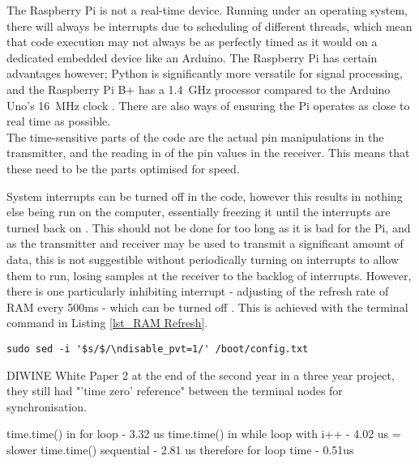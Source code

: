 \documentclass[../main.tex]{subfiles}
\begin{document}

The Raspberry Pi is not a real-time device.
Running under an operating system, there will always be interrupts due to scheduling of different threads, which mean that code execution may not always be as perfectly timed as it would on a dedicated embedded device like an Arduino.
The Raspberry Pi has certain advantages however; Python is significantly more versatile for signal processing, and the Raspberry Pi B+ has a \SI{1.4}{\giga\hertz} processor compared to the Arduino Uno's \SI{16}{\mega\hertz} clock \cite{lib_Arduino}.
There are also ways of ensuring the Pi operates as close to real time as possible.\\

The time-sensitive parts of the code are the actual pin manipulations in the transmitter, and the reading in of the pin values in the receiver.
This means that these need to be the parts optimised for speed.

System interrupts can be turned off in the code, however this results in nothing else being run on the computer, essentially freezing it until the interrupts are turned back on \cite{web_Interrupts}.
This should not be done for too long as it is bad for the Pi, and as the transmitter and receiver may be used to transmit a significant amount of data, this is not suggestible without periodically turning on interrupts to allow them to run, losing samples at the receiver to the backlog of interrupts.
However, there is one particularly inhibiting interrupt - adjusting of the refresh rate of RAM every 500ms - which can be turned off \cite{web_PiOscilloscope}.
This is achieved with the terminal command in Listing \ref{lst_RAM Refresh}.\\

\lstset{style=C}
\begin{lstlisting}[caption={Turning off the RAM refresh rate adjustment}, label={lst_RAM Refresh}]
	sudo sed -i '$s/$/\ndisable_pvt=1/' /boot/config.txt
\end{lstlisting}


DIWINE White Paper 2 \cite{pap_DIWINEpaper2} at the end of the second year in a three year project, they still had "'time zero' reference" between the terminal nodes for synchronisation.

time.time() in for loop - 3.32 us
time.time() in while loop with i++ - 4.02 us = slower
time.time() sequential - 2.81 us
therefore for loop time - 0.51us
\end{document}
